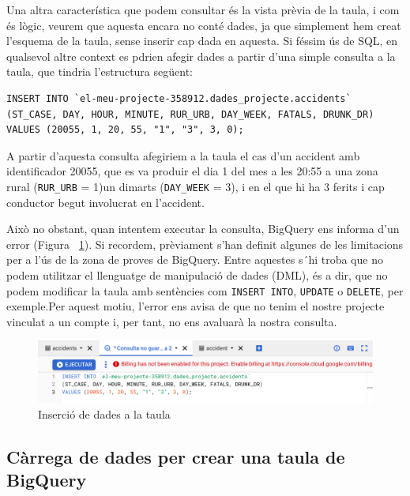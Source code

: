 \documentclass[12pt,longbibliography]{article}
\theoremstyle{definition}
\theoremstyle{remark}
\begin{document}
Una altra característica que podem consultar és la vista prèvia de la taula, i com és lògic, veurem que aquesta encara no conté dades, ja que simplement hem creat l'esquema de la taula, sense inserir cap dada en aquesta. Si féssim ús de SQL, en qualsevol altre context es pdrien afegir dades a partir d'una simple consulta a la taula, que tindria l'estructura següent:

\begin{verbatim}
INSERT INTO `el-meu-projecte-358912.dades_projecte.accidents` 
(ST_CASE, DAY, HOUR, MINUTE, RUR_URB, DAY_WEEK, FATALS, DRUNK_DR)
VALUES (20055, 1, 20, 55, "1", "3", 3, 0);
\end{verbatim}

A partir d'aquesta consulta afegiriem a la taula el cas d'un accident amb identificador 20055, que es va produir el dia 1 del mes a les 20:55 a una zona rural (\verb|RUR_URB| = 1)un dimarts (\verb|DAY_WEEK| = 3), i en el que hi ha 3 ferits i cap conductor begut involucrat en l'accident.

Això no obstant, quan intentem executar la consulta, BigQuery ens informa d'un error (Figura ~\ref{fig:bq11}). Si recordem, prèviament s'han definit algunes de les limitacions per a l'ús de la zona de proves de BigQuery. Entre aquestes s´hi troba que no podem utilitzar el llenguatge de manipulació de dades (DML), és a dir, que no podem modificar la taula amb sentències com \verb|INSERT INTO|, \verb|UPDATE| o \verb|DELETE|, per exemple.Per aquest motiu, l'error ens avisa de que no tenim el nostre projecte vinculat a un compte i, per tant, no ens avaluarà la nostra consulta.

\vspace{2mm}
\begin{figure}[h!]
\begin{center}
\includegraphics[width=12cm]{bq11}
\end{center}
\caption{Inserció de dades a la taula}
\label{fig:bq11}
\end{figure}
\vspace{2mm}

\subsection{Càrrega de dades per crear una taula de BigQuery}
\end{document}
